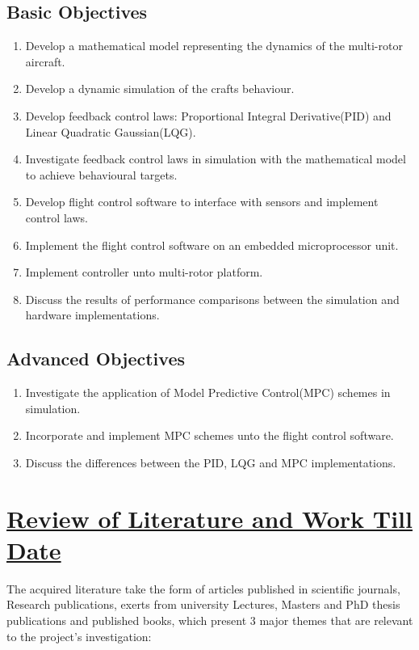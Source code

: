 \documentclass[12pt,a4paper,twoside]{report}
\begin{document}
			\subsection*{Basic Objectives}
			
				\begin{enumerate}
					\item
						Develop a mathematical model representing the dynamics of the multi-rotor aircraft.
					\item
						Develop a dynamic simulation of the crafts behaviour.
					\item
						Develop feedback control laws: Proportional Integral Derivative(PID) and Linear Quadratic Gaussian(LQG).
					\item
						Investigate feedback control laws in simulation with the mathematical model to achieve behavioural targets.
					\item
						Develop flight control software to interface with sensors and implement control laws.
					\item
						Implement the flight control software on an embedded microprocessor unit.
					\item
						Implement controller unto multi-rotor platform.
					\item
						Discuss the results of performance comparisons between the simulation and hardware implementations.
				\end{enumerate}
			
			\subsection*{Advanced Objectives}
			
				\begin{enumerate}
					\item
						Investigate the application of Model Predictive Control(MPC) schemes in simulation.
					\item	
						Incorporate and implement MPC schemes unto the flight control software.
					\item	
						Discuss the differences between the PID, LQG and MPC implementations.
				\end{enumerate}
		
	\section*{\underline{Review of Literature and Work Till Date}}
		
		The acquired literature take the form of articles published in scientific journals, Research publications, exerts from university Lectures, Masters and PhD thesis publications and published books, which present 3 major themes that are relevant to the project's investigation:
		
\end{document}
